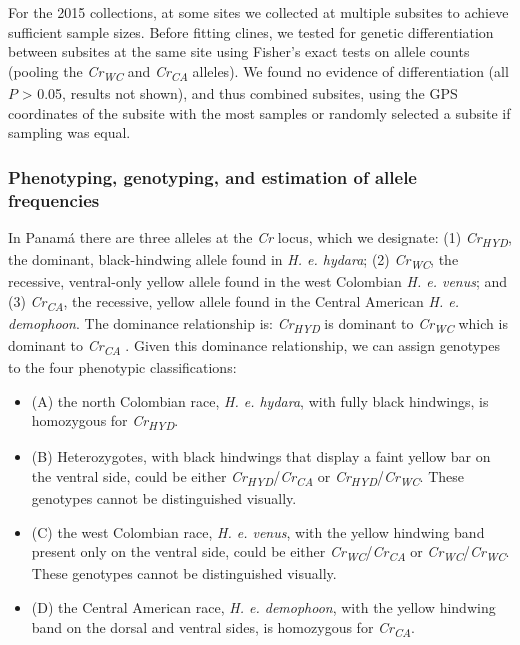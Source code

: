 \documentclass[]{article}
\begin{document}
For the 2015 collections, at some sites we collected at multiple
subsites to achieve sufficient sample sizes. Before fitting clines, we
tested for genetic differentiation between subsites at the same site
using Fisher's exact tests on allele counts (pooling the
\textit{Cr\textsubscript{WC}} and \textit{Cr\textsubscript{CA}}
alleles). We found no evidence of differentiation (all \(P\)
\textgreater{} 0.05, results not shown), and thus combined subsites,
using the GPS coordinates of the subsite with the most samples or
randomly selected a subsite if sampling was equal.

\subsubsection{Phenotyping, genotyping, and estimation of allele
frequencies}\label{phenotyping-genotyping-and-estimation-of-allele-frequencies}

In Panamá there are three alleles at the \textit{Cr} locus, which we
designate: (1) \textit{Cr\textsubscript{HYD}}, the dominant,
black-hindwing allele found in \textit{H. e. hydara}; (2)
\textit{Cr\textsubscript{WC}}, the recessive, ventral-only yellow allele
found in the west Colombian \textit{H. e. venus}; and (3)
\textit{Cr\textsubscript{CA}}, the recessive, yellow allele found in the
Central American \textit{H. e. demophoon}. The dominance relationship
is: \textit{Cr\textsubscript{HYD}} is dominant to
\textit{Cr\textsubscript{WC}} which is dominant to
\textit{Cr\textsubscript{CA}} \citep{Mallet:1986vj}. Given this
dominance relationship, we can assign genotypes to the four phenotypic
classifications:

\begin{itemize}

\item[] (A) the north Colombian race, \textit{H. e. hydara}, with fully black hindwings, is homozygous for \textit{Cr\textsubscript{HYD}}.

\item[] (B) Heterozygotes, with black hindwings that display a faint yellow bar on the ventral side, could be either \textit{Cr\textsubscript{HYD}}/\textit{Cr\textsubscript{CA}} or \textit{Cr\textsubscript{HYD}}/\textit{Cr\textsubscript{WC}}. These genotypes cannot be distinguished visually. 


\item[] (C) the west Colombian race, \textit{H. e. venus}, with the yellow hindwing band present only on the ventral side, could be either \textit{Cr\textsubscript{WC}}/\textit{Cr\textsubscript{CA}} or \textit{Cr\textsubscript{WC}}/\textit{Cr\textsubscript{WC}}. These genotypes cannot be distinguished visually.


\item[] (D) the Central American race, \textit{H. e. demophoon}, with the yellow hindwing band on the dorsal and ventral sides, is homozygous for \textit{Cr\textsubscript{CA}}.

\end{itemize}
\end{document}
